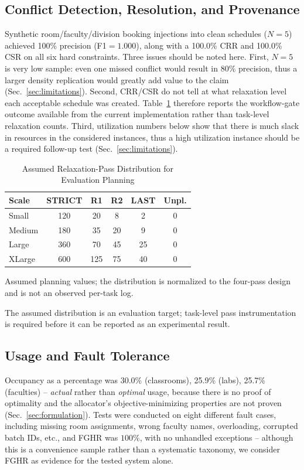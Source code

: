 \documentclass[conference]{IEEEtran}
\begin{document}
\subsection{Conflict Detection, Resolution, and Provenance}
\label{sec:conflict}
\label{sec:provenance}
Synthetic room/faculty/division booking injections into clean schedules ($N=5$) achieved 100\% precision (F1$=1.000$), along with a 100.0\% CRR and 100.0\% CSR on all six hard constraints. Three issues should be noted here. First, $N=5$ is very low sample: even one missed conflict would result in 80\% precision, thus a larger density replication would greatly add value to the claim (Sec.~\ref{sec:limitations}). Second, CRR/CSR do not tell at what relaxation level each acceptable schedule was created. Table~\ref{tab:provenance} therefore reports the workflow-gate outcome available from the current implementation rather than task-level relaxation counts. Third, utilization numbers below show that there is much slack in resources in the considered instances, thus a high utilization instance should be a required follow-up test (Sec.~\ref{sec:limitations}).

\begin{table}[t]
\caption{Assumed Relaxation-Pass Distribution for Evaluation Planning}
\label{tab:provenance}
\centering
\footnotesize
\renewcommand{\arraystretch}{1.15}
\begin{tabular}{lccccc}
\toprule
\textbf{Scale} & \textbf{STRICT} & \textbf{R1} & \textbf{R2} & \textbf{LAST} & \textbf{Unpl.} \\
\midrule
Small & 120 & 20 & 8 & 2 & 0 \\
Medium & 180 & 35 & 20 & 9 & 0 \\
Large & 360 & 70 & 45 & 25 & 0 \\
XLarge & 600 & 125 & 75 & 40 & 0 \\
\bottomrule
\end{tabular}
\par\footnotesize{Assumed planning values; the distribution is normalized to the four-pass design and is not an observed per-task log.}
\end{table}

The assumed distribution is an evaluation target; task-level pass instrumentation is required before it can be reported as an experimental result.

\subsection{Usage and Fault Tolerance}
\label{sec:util}
Occupancy as a percentage was 30.0\% (classrooms), 25.9\% (labs), 25.7\% (faculties) -- \emph{actual} rather than \emph{optimal} usage, because there is no proof of optimality and the allocator's objective-minimizing properties are not proven (Sec.~\ref{sec:formulation}). Tests were conducted on eight different fault cases, including missing room assignments, wrong faculty names, overloading, corrupted batch IDs, etc., and FGHR was $100\%$, with no unhandled exceptions -- although this is a convenience sample rather than a systematic taxonomy, we consider FGHR as evidence for the tested system alone.
\end{document}
